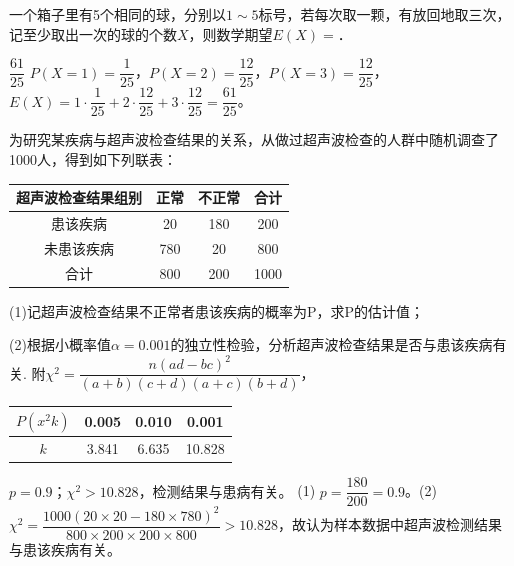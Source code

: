 


\begin{question}
一个箱子里有5个相同的球，分别以$1\sim5$标号，若每次取一颗，有放回地取三次，记至少取出一次的球的个数$X$，则数学期望$E(X)=$\blank{3cm}．
\end{question}
\begin{answer}{$\dfrac{61}{25}$}
$P(X=1)=\dfrac1{25}$，$P(X=2)=\dfrac{12}{25}$，$P(X=3)=\dfrac{12}{25}$，$E(X)=1\cdot\dfrac1{25}+2\cdot\dfrac{12}{25}+3\cdot\dfrac{12}{25}=\dfrac{61}{25}$。
\end{answer}

\begin{question}
为研究某疾病与超声波检查结果的关系，从做过超声波检查的人群中随机调查了1000人，得到如下列联表：

\begin{center}
\begin{tabular}{|c|c|c|c|}
\hline
超声波检查结果组别 & 正常 & 不正常 & 合计 \\ \hline
患该疾病 & 20 & 180 & 200 \\ \hline
未患该疾病 & 780 & 20 & 800 \\ \hline
合计 & 800 & 200 & 1000 \\ \hline
\end{tabular}
\end{center}

(1)记超声波检查结果不正常者患该疾病的概率为P，求P的估计值；

(2)根据小概率值$\alpha =0.001$的独立性检验，分析超声波检查结果是否与患该疾病有关.
附$\chi^2=\dfrac{n(a d-b c)^2}{(a+b)(c+d)(a+c)(b+d)}$，

\begin{center}
\begin{tabular}{|c|c|c|c|}
\hline
$P\left( x^2k \right)$ & 0.005 & 0.010 & 0.001 \\ \hline
$k$ & 3.841 & 6.635 & 10.828 \\ \hline
\end{tabular}
\end{center}
\end{question}
\begin{answer}{$p=0.9$；$\chi^2>10.828$，检测结果与患病有关。}
(1) $p=\dfrac{180}{200}=0.9$。(2) $\chi^2=\dfrac{1000(20\times20-180\times780)^2}{800\times200\times200\times800}>10.828$，故认为样本数据中超声波检测结果与患该疾病有关。
\end{answer}

